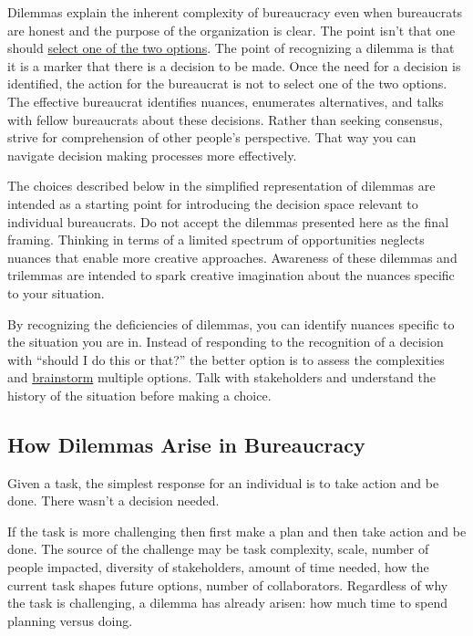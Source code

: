 Dilemmas explain the inherent complexity of bureaucracy even when bureaucrats are honest and the purpose of the organization is clear.
The point isn't that one should \href{https://en.wikipedia.org/wiki/False_dilemma}{select one of the two options}. The point of recognizing a dilemma is that it is a marker that there is a decision to be made.
Once the need for a decision is identified, the action for the bureaucrat is not to select one of the two options. The effective bureaucrat identifies nuances, enumerates alternatives, and talks with fellow bureaucrats about these decisions. Rather than seeking consensus, strive for comprehension of other people's perspective. That way you can navigate decision making processes more effectively.

The choices described below in the simplified representation of dilemmas are intended as a starting point for introducing the decision space relevant to individual bureaucrats. Do not accept the dilemmas presented here as the final framing. Thinking in terms of a limited spectrum of opportunities neglects nuances that enable more creative approaches. 
Awareness of these dilemmas and trilemmas are intended to spark creative imagination about the nuances specific to your situation.

By recognizing the deficiencies of dilemmas, you can identify nuances specific to the situation you are in. Instead of responding to the recognition of a decision with ``should I do this or that?'' the better option is to assess the complexities and \href{https://en.wikipedia.org/wiki/Brainstorming}{brainstorm} multiple options. Talk with stakeholders and understand the history of the situation before making a choice.



\subsection*{How Dilemmas Arise in Bureaucracy}

Given a task, the simplest response for an individual is to take action and be done. There wasn't a decision needed.

If the task is more challenging then first make a plan and then take action and be done. The source of the challenge may be task complexity, scale, number of people impacted, diversity of stakeholders, amount of time needed, how the current task shapes future options, number of collaborators. Regardless of why the task is challenging, a dilemma has already arisen: how much time to spend planning versus doing. 

